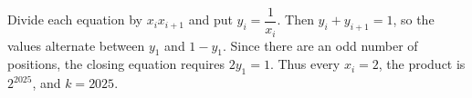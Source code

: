 Divide each equation by $x_ix_{i+1}$ and put $y_i=\dfrac{1}{x_i}$. Then $y_i+y_{i+1}=1$, so the values alternate between $y_1$ and $1-y_1$. Since there are an odd number of positions, the closing equation requires $2y_1=1$. Thus every $x_i=2$, the product is $2^{2025}$, and $\boxed{k=2025}$.
